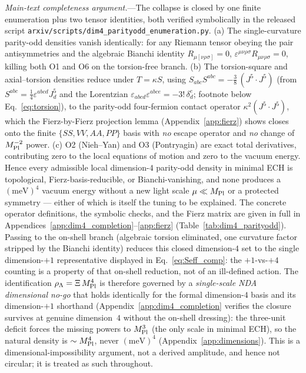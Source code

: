 \documentclass[aps,prd,twocolumn,superscriptaddress,showpacs,preprintnumbers,nofootinbib,longbibliography,floatfix]{revtex4-2}
\newcommand{\MPl}{M_{\rm Pl}}
\begin{document}
\emph{Main-text completeness argument.}---The collapse is closed by one
finite enumeration plus two tensor identities, both verified symbolically
in the released script
\texttt{arxiv/scripts/dim4\_parityodd\_enumeration.py}. (a) The single-curvature
parity-odd densities vanish identically: for any Riemann tensor obeying the
pair antisymmetries and the algebraic Bianchi identity $R_{\mu[\nu\rho\sigma]}=0$,
$\varepsilon^{\mu\nu\rho\sigma}R_{\mu\nu\rho\sigma}=0$, killing both O1 and O6
on the torsion-free branch. (b) The torsion-square and axial--torsion densities
reduce under $T=\kappa S$, using
$S_{abc}S^{abc}=-\tfrac38\,(J^5\!\cdot\!J^5)$ (from $S^{abc}=\tfrac14\varepsilon^{abcd}J^5_d$ and the
Lorentzian $\varepsilon_{abcd}\varepsilon^{abce}=-3!\,\delta^e_d$; footnote below Eq.~\eqref{eq:torsion}), to the parity-odd
four-fermion contact operator $\kappa^{2}(J^5\!\cdot\!J^5)$, which the
Fierz-by-Fierz projection lemma (Appendix~\ref{app:fierz}) shows closes onto
the finite $\{SS,VV,AA,PP\}$ basis with \emph{no} escape operator and \emph{no}
change of $\MPl^{-2}$ power. (c) O2 (Nieh--Yan) and O3 (Pontryagin) are exact
total derivatives, contributing zero to the local equations of motion and zero
to the vacuum energy. Hence every admissible local dimension-$4$ parity-odd
density in minimal ECH is topological, Fierz-basis-reducible, or
Bianchi-vanishing, and none produces a $(\text{meV})^4$ vacuum energy without a
new light scale $\mu\ll\MPl$ or a protected symmetry --- either of which is
itself the tuning to be explained. The concrete operator definitions, the
symbolic checks, and the Fierz matrix are given in full in
Appendices~\ref{app:dim4_completion}--\ref{app:fierz}
(Table~\ref{tab:dim4_parityodd}). Passing to the on-shell branch (algebraic
torsion eliminated, one curvature factor stripped by the Bianchi identity)
reduces this closed dimension-$4$ set to the single dimension-$+1$
representative displayed in Eq.~\eqref{eq:Seff_comp}: the $+1$-vs-$+4$ counting
is a property of that on-shell reduction, not of an ill-defined action.
The identification $\rho_\Lambda = \Xi\,\MPl^4$ is therefore governed by a
\textit{single-scale NDA dimensional no-go} that holds identically for the
formal dimension-$4$ basis and its dimension-$+1$ shorthand
(Appendix~\ref{app:dim4_completion} verifies the closure survives at genuine
dimension~$4$ without the on-shell dressing): the three-unit deficit forces
the missing powers to $\MPl^3$ (the only scale in minimal ECH), so the
natural density is $\sim\MPl^4$, never $(\text{meV})^4$
(Appendix~\ref{app:dimensions}). This is a dimensional-impossibility
argument, not a derived amplitude, and hence not circular; it is treated as
such throughout.
\end{document}
